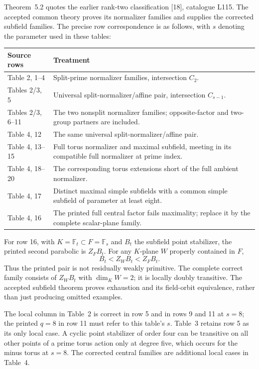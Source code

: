 \documentclass[11pt,a4paper]{article}
\newcommand{\F}{\mathbb F}
\begin{document}
Theorem~5.2 quotes the earlier rank-two classification [18], catalogue
L115. The accepted common theory proves its normalizer families and
supplies the corrected subfield families. The precise row correspondence
is as follows, with $s$ denoting the parameter used in these tables:
\begin{center}\small
\begin{tabular}{p{26mm}p{109mm}}\toprule
Source rows & Treatment \\\midrule
Table 2, 1--4 & Split-prime normalizer families, intersection $C_2$.\\
Tables 2/3, 5 & Universal split-normalizer/affine pair, intersection $C_{s-1}$.\\
Tables 2/3, 6--11 & The two nonsplit normalizer families; opposite-factor and two-group partners are included.\\
Table 4, 12 & The same universal split-normalizer/affine pair.\\
Table 4, 13--15 & Full torus normalizer and maximal subfield, meeting in its compatible full normalizer at prime index.\\
Table 4, 18--20 & The corresponding torus extensions short of the full ambient normalizer.\\
Table 4, 17 & Distinct maximal simple subfields with a common simple subfield of parameter at least eight.\\
Table 4, 16 & The printed full central factor fails maximality; replace it by the complete scalar-plane family.\\\bottomrule
\end{tabular}
\end{center}
For row 16, with $K=\F_t\subset F=\F_s$ and $B_t$ the subfield
point stabilizer, the printed second parabolic is $Z_FB_t$.
For any $K$-plane $W$ properly contained in $F$,
\[
 B_t<Z_WB_t<Z_FB_t.
\]
Thus the printed pair is not residually weakly primitive. The complete
correct family consists of $Z_WB_t$ with $\dim_K W=2$; it is locally
doubly transitive. The accepted subfield theorem proves exhaustion and
its field-orbit equivalence, rather than just producing omitted examples.

The local column in Table~2 is correct in row 5 and in rows 9 and 11
at $s=8$; the printed $q=8$ in row 11 must refer to this table's $s$.
Table~3 retains row 5 as its only local case. A cyclic point stabilizer
of order four can be transitive on all other points of a prime torus
action only at degree five, which occurs for the minus torus at $s=8$.
The corrected central families are additional local cases in Table~4.
\end{document}

